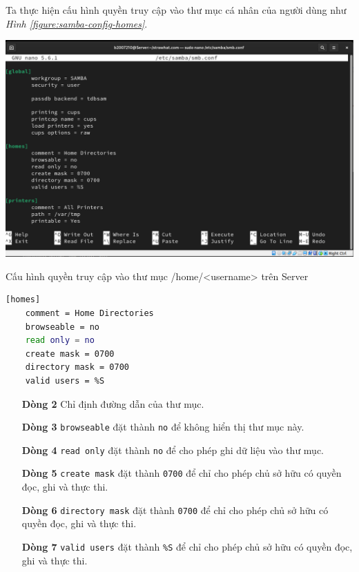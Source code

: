 \documentclass[a4paper, 11pt]{article}
\begin{document}
Ta thực hiện cấu hình quyền truy cập vào thư mục cá nhân của người dùng như \textit{Hình \ref{figure:samba-config-homes}}.

\begin{minipage}
    {\linewidth}
    \captionsetup{type=figure}
    \centering
    \includegraphics[width=\linewidth]{images/samba-config-homes.png}
    \caption{Cấu hình quyền truy cập vào thư mục /home/<username> trên Server}
    \label{figure:samba-config-homes}
\end{minipage}

\begin{lstlisting}[language=bash, caption=Cấu hình quyền truy cập vào thư mục /home/<username> trên Server]
[homes]
    comment = Home Directories
    browseable = no
    read only = no
    create mask = 0700
    directory mask = 0700
    valid users = %S
\end{lstlisting}

\begin{itemize}
    \item [\textbf{Dòng 2}] Chỉ định đường dẫn của thư mục.
    \item [\textbf{Dòng 3}] \texttt{browseable} đặt thành \texttt{no} để không hiển thị thư mục này.
    \item [\textbf{Dòng 4}] \texttt{read only} đặt thành \texttt{no} để cho phép ghi dữ liệu vào thư mục.
    \item [\textbf{Dòng 5}] \texttt{create mask} đặt thành \texttt{0700} để chỉ cho phép chủ sở hữu có quyền đọc, ghi và thực thi.
    \item [\textbf{Dòng 6}] \texttt{directory mask} đặt thành \texttt{0700} để chỉ cho phép chủ sở hữu có quyền đọc, ghi và thực thi.
    \item [\textbf{Dòng 7}] \texttt{valid users} đặt thành \texttt{\%S} để chỉ cho phép chủ sở hữu có quyền đọc, ghi và thực thi.
\end{itemize}
\end{document}
